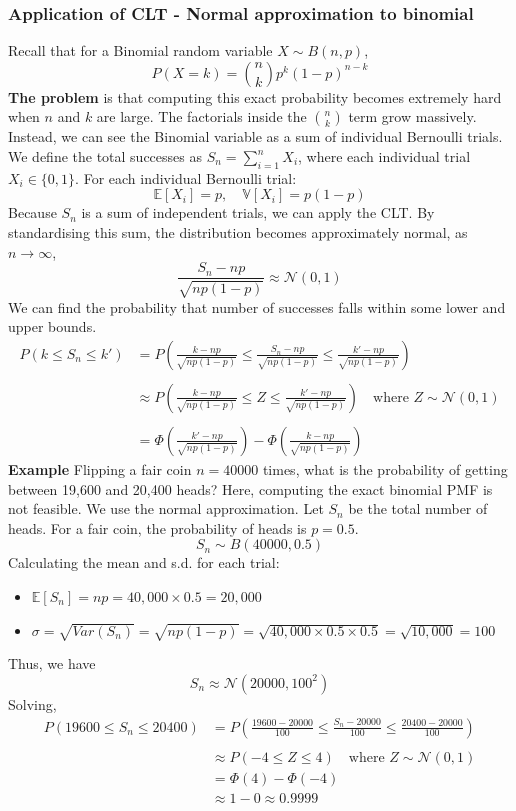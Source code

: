 \documentclass[../Probability.tex]{subfiles}
\begin{document}
\subsubsection{Application of CLT - Normal approximation to binomial}
Recall that for a Binomial random variable $X \sim B(n, p)$,
$$P(X=k) = \binom{n}{k} p^k (1-p)^{n-k}$$
\textbf{The problem} is that computing this exact probability becomes extremely hard when $n$ and $k$ are large. The factorials inside the $\binom{n}{k}$ term grow massively.\newline
Instead, we can see the Binomial variable as a sum of individual Bernoulli trials.\newline
We define the total successes as $S_n = \sum_{i=1}^n X_i$, where each individual trial $X_i \in \{0, 1\}$.\newline
For each individual Bernoulli trial:
\[\mathbb{E}[X_i] = p,\quad \mathbb{V}[X_i] = p(1 - p)\]
Because $S_n$ is a sum of independent trials, we can apply the CLT. By standardising this sum, the distribution becomes approximately normal, as $n \to \infty$,
$$\frac{S_n - np}{\sqrt{np(1-p)}} \approx \mathcal{N}(0, 1)$$
We can find the probability that number of successes falls within some lower and upper bounds.
\begin{align*}
P(k \le S_n \le k') &= P\left(\frac{k - np}{\sqrt{np(1-p)}} \le \frac{S_n - np}{\sqrt{np(1-p)}} \le \frac{k' - np}{\sqrt{np(1-p)}}\right) \\
\\
&\approx P\left(\frac{k - np}{\sqrt{np(1-p)}} \le Z \le \frac{k' - np}{\sqrt{np(1-p)}}\right) \quad \text{where } Z \sim \mathcal{N}(0, 1) \\
\\
&= \Phi\left(\frac{k' - np}{\sqrt{np(1-p)}}\right) - \Phi\left(\frac{k - np}{\sqrt{np(1-p)}}\right)
\end{align*}
\textbf{Example} Flipping a fair coin $n = 40000$ times, what is the probability of getting between 19,600 and 20,400 heads?\newline
Here, computing the exact binomial PMF is not feasible. We use the normal approximation.\newline
Let $S_n$ be the total number of heads. For a fair coin, the probability of heads is $p = 0.5$.
\[S_n \sim B(40000, 0.5)\]
Calculating the mean and s.d. for each trial:
\begin{itemize}
    \item $\mathbb{E}[S_n] = np = 40,000 \times 0.5 = 20,000$
    \item $\sigma = \sqrt{Var(S_n)} = \sqrt{np(1-p)} = \sqrt{40,000 \times 0.5 \times 0.5} = \sqrt{10,000} = 100$
\end{itemize}
Thus, we have
$$S_n \approx \mathcal{N}(20000, 100^2)$$
Solving,
\begin{align*}
P(19600 \le S_n \le 20400) &= P\left(\frac{19600 - 20000}{100} \le \frac{S_n - 20000}{100} \le \frac{20400 - 20000}{100}\right) \\
\\
&\approx P(-4 \le Z \le 4) \quad \text{where } Z \sim \mathcal{N}(0, 1) \\
&= \Phi(4) - \Phi(-4) \\
&\approx 1 - 0 \approx 0.9999
\end{align*}
\end{document}
